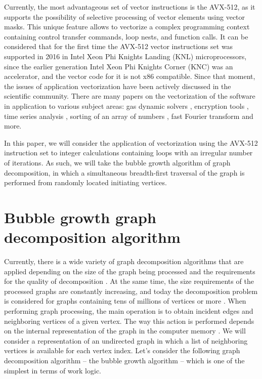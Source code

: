 \documentclass[
11pt,%
tightenlines,%
twoside,%
onecolumn,%
nofloats,%
nobibnotes,%
nofootinbib,%
superscriptaddress,%
noshowpacs,%
centertags]%
{revtex4}
\begin{document}
Currently, the most advantageous set of vector instructions is the AVX-512, as it supports the possibility of selective processing of vector elements using vector masks.
This unique feature allows to vectorize a complex programming context containing control transfer commands, loop nests, and function calls.
It can be considered that for the first time the AVX-512 vector instructions set was supported in 2016 in Intel Xeon Phi Knights Landing (KNL) microprocessors, since the earlier generation Intel Xeon Phi Knights Corner (KNC) was an accelerator, and the vector code for it is not x86 compatible.
Since that moment, the issues of application vectorization have been actively discussed in the scientific community.
There are many papers on the vectorization of the software in application to various subject areas: gas dynamic solvers \cite{12-1Kulikov}, encryption tools \cite{12-2Buhrow}, time series analysis \cite{12-3Quislant}, sorting of an array of numbers \cite{12-4Blacher}, fast Fourier transform \cite{12-5Sansone} and more.

In this paper, we will consider the application of vectorization using the AVX-512 instruction set to integer calculations containing loops with an irregular number of iterations.
As such, we will take the bubble growth algorithm of graph decomposition, in which a simultaneous breadth-first traversal of the graph is performed from randomly located initiating vertices.

\section{Bubble growth graph decomposition algorithm}

Currently, there is a wide variety of graph decomposition algorithms that are applied depending on the size of the graph being processed and the requirements for the quality of decomposition \cite{13Ayall}.
At the same time, the size requirements of the processed graphs are constantly increasing, and today the decomposition problem is considered for graphs containing tens of millions of vertices or more \cite{14Lee}.
When performing graph processing, the main operation is to obtain incident edges and neighboring vertices of a given vertex.
The way this action is performed depends on the internal representation of the graph in the computer memory \cite{15Ahmed,16Salwasser}.
We will consider a representation of an undirected graph in which a list of neighboring vertices is available for each vertex index.
Let's consider the following graph decomposition algorithm -- the bubble growth algorithm -- which is one of the simplest in terms of work logic.
\end{document}
